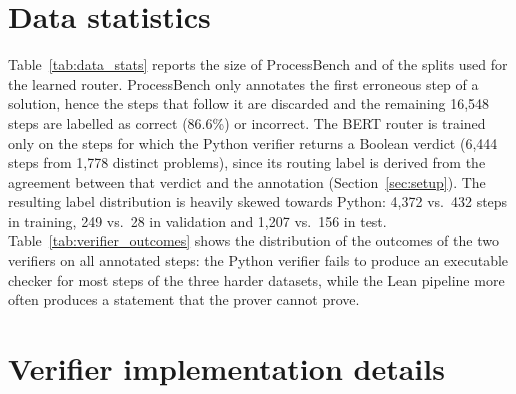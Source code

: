 \section{Data statistics}
\label{app:data_stats}
Table~\ref{tab:data_stats} reports the size of ProcessBench \cite{processbench} and of the splits used for the learned router. ProcessBench only annotates the first erroneous step of a solution, hence the steps that follow it are discarded and the remaining 16,548 steps are labelled as correct (86.6\%) or incorrect. The BERT router is trained only on the steps for which the Python verifier returns a Boolean verdict (6,444 steps from 1,778 distinct problems), since its routing label is derived from the agreement between that verdict and the annotation (Section~\ref{sec:setup}). The resulting label distribution is heavily skewed towards Python: 4,372 vs.\ 432 steps in training, 249 vs.\ 28 in validation and 1,207 vs.\ 156 in test. Table~\ref{tab:verifier_outcomes} shows the distribution of the outcomes of the two verifiers on all annotated steps: the Python verifier fails to produce an executable checker for most steps of the three harder datasets, while the Lean pipeline more often produces a statement that the prover cannot prove.




\section{Verifier implementation details}
\label{app:verifiers}
